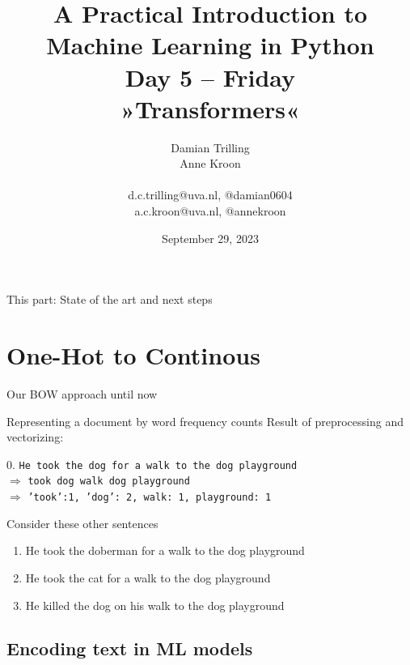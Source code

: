 \documentclass[compress]{beamer}
\title[ML in PYthon]{\textbf{A Practical Introduction to Machine Learning in Python} \\Day 5 -- Friday \\ »Transformers«}
\author[Damian Trilling, Anne Kroon]{Damian Trilling \\ Anne Kroon \\ ~ \\ \footnotesize{d.c.trilling@uva.nl, @damian0604 \\a.c.kroon@uva.nl, @annekroon} \\}
\date{September 29, 2023}
\institute[Gesis]{Gesis}
\begin{document}
\begin{frame}{}
	\titlepage
\end{frame}

\begin{frame}{This part: State of the art and next steps}
	\tableofcontents
\end{frame}


\section{One-Hot to Continous}

\begin{frame}{Our BOW approach until now}
	\begin{block}{Representing a document by word frequency counts}
		Result of preprocessing and vectorizing:
		
		0. \texttt{He took the dog for a walk to the dog playground}\\
		$\Rightarrow$ \texttt{took dog walk dog playground}\\
		$\Rightarrow$ \texttt{'took':1, 'dog': 2, walk: 1, playground: 1}
	\end{block}
	
	Consider these other sentences
	\begin{enumerate}
		\item<2-> He took the doberman for a walk to the dog playground
		\item<3-> He took the cat for a walk to the dog playground
		\item<4-> He killed the dog on his walk to the dog playground 
	\end{enumerate}
	
\end{frame}

\subsection{Encoding text in ML models}
\end{document}
